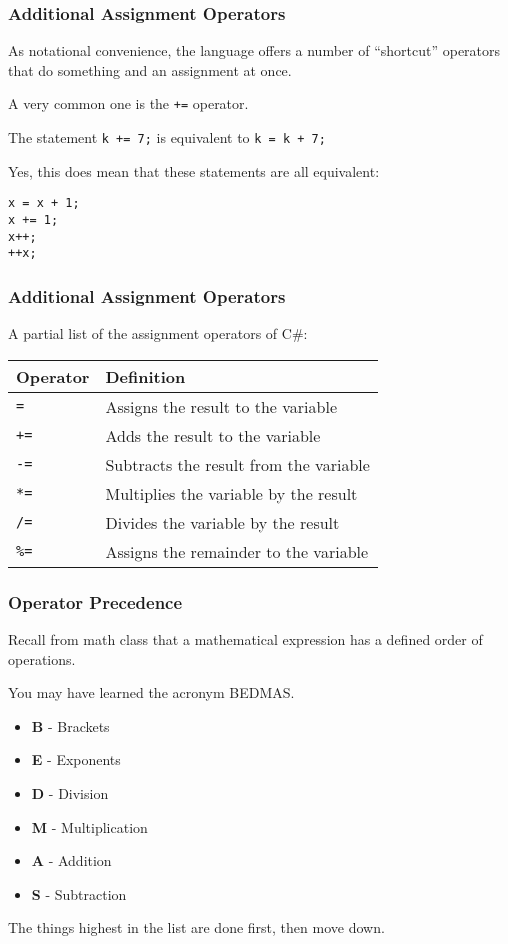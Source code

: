 \begin{frame}[fragile]
\frametitle{Additional Assignment Operators}

As notational convenience, the language offers a number of ``shortcut'' operators that do something and an assignment at once.

A very common one is the \texttt{+=} operator.

The statement \texttt{k += 7;} is equivalent to \texttt{k = k + 7;}

Yes, this does mean that these statements are all equivalent:
\vspace{-3em}

\begin{verbatim}
x = x + 1;
x += 1;
x++;
++x;
\end{verbatim}

\end{frame}

\begin{frame}
\frametitle{Additional Assignment Operators}

A partial list of the assignment operators of C\#:

\begin{center}
\begin{tabular}{l|l}
\textbf{Operator} & \textbf{Definition} \\ \hline
	\texttt{=} & Assigns the result to the variable\\ \hline
	\texttt{+=} & Adds the result to the variable\\ \hline
	\texttt{-=} & Subtracts the result from the variable\\ \hline
	\texttt{*=} & Multiplies the variable by the result\\ \hline
	\texttt{/=} & Divides the variable by the result\\ \hline
	\texttt{\%=} & Assigns the remainder to the variable\\ 
\end{tabular}
\end{center}

\end{frame}

\begin{frame}
\frametitle{Operator Precedence}

Recall from math class that a mathematical expression has a defined order of operations. 

You may have learned the acronym BEDMAS.

\begin{itemize}
	\item \textbf{B} - Brackets
	\item \textbf{E} - Exponents
	\item \textbf{D} - Division
	\item \textbf{M} - Multiplication
	\item \textbf{A} - Addition
	\item \textbf{S} - Subtraction
\end{itemize}

The things highest in the list are done first, then move down.

\end{frame}


